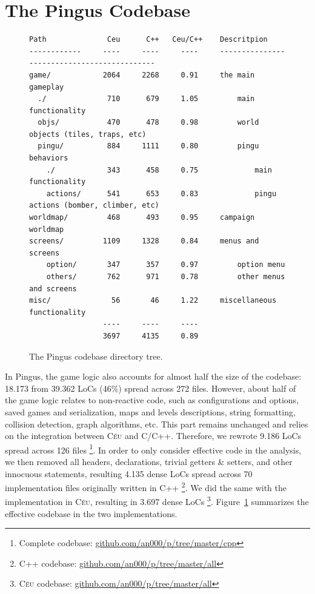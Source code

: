 \documentclass{vgtc}                          %
\newcommand{\CEU}{\textsc{C\'{e}u}\xspace}
\begin{document}
\section{The Pingus Codebase}
\label{sec.codebase}

\begin{figure}[t]
\begin{verbatim}
Path              Ceu      C++   Ceu/C++    Descritpion
------------     ----     ----     ----     --------------------------------------------
game/            2064     2268     0.91     the main gameplay
  ./              710      679     1.05         main functionality
  objs/           470      478     0.98         world objects (tiles, traps, etc)
  pingu/          884     1111     0.80         pingu behaviors
    ./            343      458     0.75             main functionality
    actions/      541      653     0.83             pingu actions (bomber, climber, etc)
worldmap/         468      493     0.95     campaign worldmap
screens/         1109     1328     0.84     menus and screens
    option/       347      357     0.97         option menu
    others/       762      971     0.78         other menus and screens
misc/              56       46     1.22     miscellaneous functionality
                 ----     ----     ----
                 3697     4135     0.89
\end{verbatim}
\caption{The Pingus codebase directory tree.
\label{tab.tree}
}
\end{figure}

In Pingus, the game logic also accounts for almost half the size of the
codebase: 18.173 from 39.362 LoCs (46\%) spread across 272 files.
%
However, about half of the game logic relates to non-reactive code, such as
configurations and options, saved games and serialization, maps and levels
descriptions, string formatting, collision detection, graph algorithms, etc.
This part remains unchanged and relies on the integration between \CEU and
C/C++.
%
Therefore, we rewrote 9.186 LoCs spread across 126 files%
\footnote{Complete codebase: \url{github.com/an000/p/tree/master/cpp}}.
%
In order to only consider effective code in the analysis, we then removed all
headers, declarations, trivial getters \& setters, and other innocuous
statements, resulting 4.135 dense LoCs spread across 70 implementation files
originally written in C++%
\footnote{C++ codebase: \url{github.com/an000/p/tree/master/all}}.
We did the same with the implementation in \CEU, resulting in 3.697 dense LoCs%
\footnote{\CEU codebase: \url{github.com/an000/p/tree/master/all}}.
%
Figure~\ref{tab.tree} summarizes the effective codebase in the two
implementations.
\end{document}
